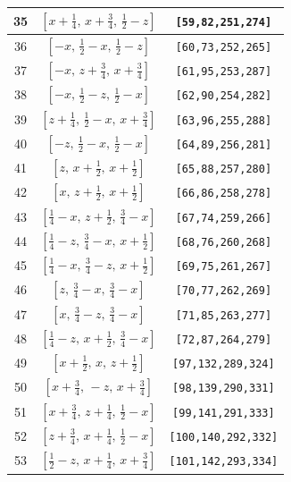 \documentclass[fleqn,8pt]{jsarticle}
\begin{document}
\begin{longtable}{ccc}
35 & $\left[ x + \frac{1}{4},\, x + \frac{3}{4},\, \frac{1}{2} - z \right]$ & {\tt [59,82,251,274]} \\ \hline
36 & $\left[ - x,\, \frac{1}{2} - x,\, \frac{1}{2} - z \right]$ & {\tt [60,73,252,265]} \\ \hline
37 & $\left[ - x,\, z + \frac{3}{4},\, x + \frac{3}{4} \right]$ & {\tt [61,95,253,287]} \\ \hline
38 & $\left[ - x,\, \frac{1}{2} - z,\, \frac{1}{2} - x \right]$ & {\tt [62,90,254,282]} \\ \hline
39 & $\left[ z + \frac{1}{4},\, \frac{1}{2} - x,\, x + \frac{3}{4} \right]$ & {\tt [63,96,255,288]} \\ \hline
40 & $\left[ - z,\, \frac{1}{2} - x,\, \frac{1}{2} - x \right]$ & {\tt [64,89,256,281]} \\ \hline
41 & $\left[ z,\, x + \frac{1}{2},\, x + \frac{1}{2} \right]$ & {\tt [65,88,257,280]} \\ \hline
42 & $\left[ x,\, z + \frac{1}{2},\, x + \frac{1}{2} \right]$ & {\tt [66,86,258,278]} \\ \hline
43 & $\left[ \frac{1}{4} - x,\, z + \frac{1}{2},\, \frac{3}{4} - x \right]$ & {\tt [67,74,259,266]} \\ \hline
44 & $\left[ \frac{1}{4} - z,\, \frac{3}{4} - x,\, x + \frac{1}{2} \right]$ & {\tt [68,76,260,268]} \\ \hline
45 & $\left[ \frac{1}{4} - x,\, \frac{3}{4} - z,\, x + \frac{1}{2} \right]$ & {\tt [69,75,261,267]} \\ \hline
46 & $\left[ z,\, \frac{3}{4} - x,\, \frac{3}{4} - x \right]$ & {\tt [70,77,262,269]} \\ \hline
47 & $\left[ x,\, \frac{3}{4} - z,\, \frac{3}{4} - x \right]$ & {\tt [71,85,263,277]} \\ \hline
48 & $\left[ \frac{1}{4} - z,\, x + \frac{1}{2},\, \frac{3}{4} - x \right]$ & {\tt [72,87,264,279]} \\ \hline
49 & $\left[ x + \frac{1}{2},\, x,\, z + \frac{1}{2} \right]$ & {\tt [97,132,289,324]} \\ \hline
50 & $\left[ x + \frac{3}{4},\, - z,\, x + \frac{3}{4} \right]$ & {\tt [98,139,290,331]} \\ \hline
51 & $\left[ x + \frac{3}{4},\, z + \frac{1}{4},\, \frac{1}{2} - x \right]$ & {\tt [99,141,291,333]} \\ \hline
52 & $\left[ z + \frac{3}{4},\, x + \frac{1}{4},\, \frac{1}{2} - x \right]$ & {\tt [100,140,292,332]} \\ \hline
53 & $\left[ \frac{1}{2} - z,\, x + \frac{1}{4},\, x + \frac{3}{4} \right]$ & {\tt [101,142,293,334]} \\ \hline

\end{longtable}
\end{document}

